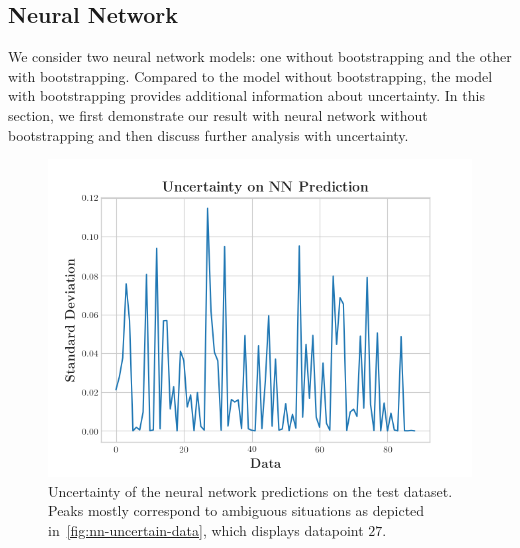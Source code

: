 \subsection{Neural Network}
We consider two neural network models: one without bootstrapping and the other with bootstrapping. 
Compared to the model without bootstrapping, the model with bootstrapping provides additional information about uncertainty.
In this section, we first demonstrate our result with neural network without bootstrapping and then discuss further analysis with uncertainty.

\begin{figure}[t]
  \centering
  \includegraphics[width=\linewidth]{figures/uncertainty.png}
  \caption{Uncertainty of the neural network predictions on the test dataset. Peaks mostly correspond to ambiguous situations as depicted in~\cref{fig:nn-uncertain-data}, which displays datapoint $27$.}
  \label{fig:nn-uncertainty}
\end{figure}

